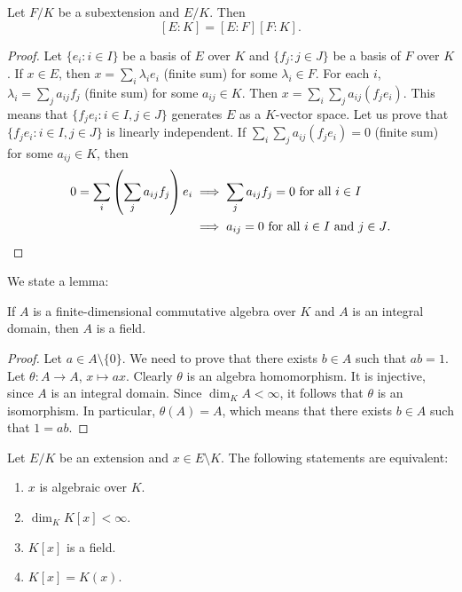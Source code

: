 \begin{proposition}
	Let $F/K$ be a subextension and $E/K$. Then
	\[
	[E:K]=[E:F][F:K].
	\]
\end{proposition}

\begin{proof}
	Let $\{e_i:i\in I\}$ be a basis of $E$ over $K$
	and $\{f_j:j\in J\}$ be a basis of $F$ over $K$. If $x\in E$,
	then $x=\sum_i \lambda_ie_i$ (finite sum) 
	for some $\lambda_i\in F$. For each $i$, 
	$\lambda_i=\sum_j a_{ij}f_j$ (finite sum)
	for some $a_{ij}\in K$. Then 
	$x=\sum_i\sum_j a_{ij}(f_je_i)$. This means
	that $\{f_je_i:i\in I,j\in J\}$ generates
	$E$ as a $K$-vector space. Let us prove that 
	$\{f_je_i:i\in I,j\in J\}$
	is linearly independent. If $\sum_i\sum_j a_{ij}(f_je_i)=0$ (finite sum)
	for some $a_{ij}\in K$, 
	then
	\begin{align*}
		0=\sum_i\left(\sum_j a_{ij}f_j\right)e_i&\implies
		\sum_j a_{ij}f_j=0\text{ for all $i\in I$}\\
		&\implies 
		a_{ij}=0\text{ for all $i\in I$ and $j\in J$}.\qedhere
	\end{align*}
\end{proof}

We state a lemma:

\begin{lemma}
If $A$ is a finite-dimensional commutative algebra over $K$ 
and $A$ is an integral domain, then $A$ is a field. 
\end{lemma}

\begin{proof}
	Let $a\in A\setminus\{0\}$. We need to prove that there exists $b\in A$
	such that $ab=1$. Let $\theta\colon A\to A$, $x\mapsto ax$. Clearly
	$\theta$ is an algebra homomorphism. It is injective, since $A$ is an
	integral domain.  Since $\dim_KA<\infty$, it follows that $\theta$ is an
	isomorphism. In particular, $\theta(A)=A$, which means that there exists
	$b\in A$ such that $1=ab$. 
\end{proof}

\begin{theorem}
	Let $E/K$ be an extension and $x\in E\setminus K$.
	The following statements are equivalent:
	\begin{enumerate}
		\item $x$ is algebraic over $K$.
		\item $\dim_KK[x]<\infty$.
		\item $K[x]$ is a field.
		\item $K[x]=K(x)$. 
	\end{enumerate}
\end{theorem}

